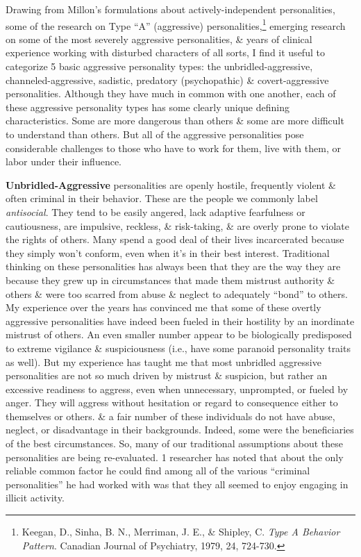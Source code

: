 \documentclass{article}
\numberwithin{equation}{section}
\begin{document}
Drawing from Millon's formulations about actively-independent personalities, some of the research on Type ``A'' (aggressive) personalities,\footnote{Keegan, D., Sinha, B. N., Merriman, J. E., \& Shipley, C. \textit{Type A Behavior Pattern}. Canadian Journal of Psychiatry, 1979, 24, 724-730.} emerging research on some of the most severely aggressive personalities, \& years of clinical experience working with disturbed characters of all sorts, I find it useful to categorize 5 basic aggressive personality types: the unbridled-aggressive, channeled-aggressive, sadistic, predatory (psychopathic) \& covert-aggressive personalities. Although they have much in common with one another, each of these aggressive personality types has some clearly unique defining characteristics. Some are more dangerous than others \& some are more difficult to understand than others. But all of the aggressive personalities pose considerable challenges to those who have to work for them, live with them, or labor under their influence.

\textbf{Unbridled-Aggressive} personalities are openly hostile, frequently violent \& often criminal in their behavior. These are the people we commonly label \textit{antisocial}. They tend to be easily angered, lack adaptive fearfulness or cautiousness, are impulsive, reckless, \& risk-taking, \& are overly prone to violate the rights of others. Many spend a good deal of their lives incarcerated because they simply won't conform, even when it's in their best interest. Traditional thinking on these personalities has always been that they are the way they are because they grew up in circumstances that made them mistrust authority \& others \& were too scarred from abuse \& neglect to adequately ``bond'' to others. My experience over the years has convinced me that some of these overtly aggressive personalities have indeed been fueled in their hostility by an inordinate mistrust of others. An even smaller number appear to be biologically predisposed to extreme vigilance \& suspiciousness (i.e., have some paranoid personality traits as well). But my experience has taught me that most unbridled aggressive personalities are not so much driven by mistrust \& suspicion, but rather an excessive readiness to aggress, even when unnecessary, unprompted, or fueled by anger. They will aggress without hesitation or regard to consequence either to themselves or others. \& a fair number of these individuals do not have abuse, neglect, or disadvantage in their backgrounds. Indeed, some were the beneficiaries of the best circumstances. So, many of our traditional assumptions about these personalities are being re-evaluated. 1 researcher has noted that about the only reliable common factor he could find among all of the various ``criminal personalities'' he had worked with was that they all seemed to enjoy engaging in illicit activity.
\end{document}
